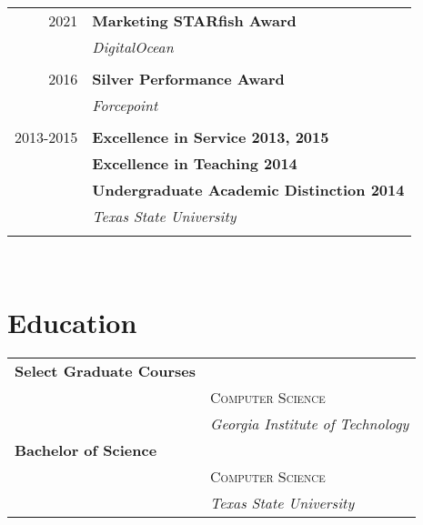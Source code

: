 \documentclass[10pt]{article} %
\begin{document}
\begin{minipage}[t]{0.44\textwidth}
\begin{tabular}{rl}
2021     & \textbf{Marketing STARfish Award}\\
& \textit{DigitalOcean} \\\\

2016     & \textbf{Silver Performance Award}\\
& \textit{Forcepoint}\\ \\

2013-2015     & \textbf{Excellence in Service 2013, 2015}\\
& \textbf{Excellence in Teaching 2014}\\
& \textbf{Undergraduate Academic Distinction 2014}\\
& \textit{Texas State University}\\\\

\end{tabular}\\



\section{Education} 

\begin{tabular}{ll} %

\textbf{Select Graduate Courses} \\ 
& \textsc{Computer Science} \\ 
& \textit{Georgia Institute of Technology}\\


\textbf{Bachelor of Science} \\ 
& \textsc{Computer Science} \\ 
& \textit{Texas State University}\\

     


\end{tabular}
\end{minipage}
\end{document}
